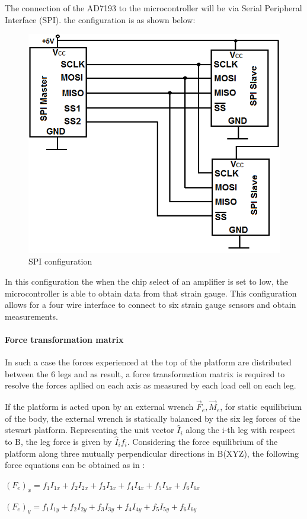 The connection of the AD7193 to the microcontroller will be via Serial Peripheral Interface (SPI). the configuration is as shown below:
\begin{center}
\begin{figure}
\centering
\includegraphics[width=0.55\linewidth]{Figures/SPI}
\caption[SPI configuration]{SPI configuration}
\end{figure}
\end{center}

In this configuration the when the chip select of an amplifier is set to low, the microcontroller is able to obtain data from that strain gauge. This configuration allows for a four wire interface to connect to six strain gauge sensors and obtain measurements.

\paragraph{Force transformation matrix} 
In such a case the forces experienced at the top of the platform are distributed between the 6 legs and as result, a force transformation matrix is required to resolve the forces apllied on each axis as measured by each load cell on each leg. 

If the platform is acted upon by an external wrench {$\vec{F}_e, \vec{M}_e$}, for static equilibrium of the body, the external wrench is statically balanced by the six leg forces of the stewart platform. Representing the unit vector $\hat{I}_i$ along the i-th leg with respect to B, the leg force is given  by $\hat{I}_if_i$. Considering the force equilibrium of the platform along  three mutually perpendicular directions in B(XYZ), the following force equations can be obtained as in \cite{dwarakanath_design_2001}:

$(F_e)_x = f_1I_{1x} + f_2I_{2x} + f_3I_{3x} + f_4I_{4x} + f_5I_{5x} + f_6I_{6x}$

$(F_e)_y = f_1I_{1y} + f_2I_{2y} + f_3I_{3y} + f_4I_{4y} + f_5I_{5y} + f_6I_{6y}$

